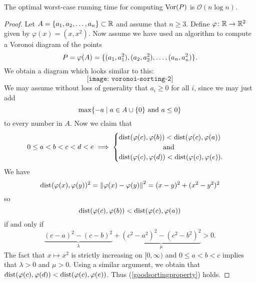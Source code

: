 \begin{thm} \label{thm:voronoicansort}
The optimal worst-case running time for computing $\operatorname{Vor}(P)$ is $\mathcal{O}(n \log n)$.
\end{thm}
\begin{proof}
Let $A = \{a_1, a_2, \ldots, a_n\} \subset \mathbb{R}$ and assume that $n \geq 3$. Define $\varphi \colon \mathbb{R} \to \mathbb{R}^2$ given by $\varphi(x) = (x, x^2)$. Now assume we have used an algorithm to compute a Voronoi diagram of the points
\[
    P = \varphi(A) = \{(a_1, a_1^2), (a_2, a_2^2), \ldots, (a_n, a_n^2)\}.
\]
We obtain a diagram which looks similar to this:
\[
    \texttt{[image: voronoi-sorting-2]}
\]
We may assume without loss of generality that $a_i \geq 0$ for all $i$, since we may just add
\[
    \max\{-a \mid a \in A \cup \{0\} \text{ and } a \leq 0\}
\]
to every number in $A$. Now we claim that
\begin{equation} \label{goodsortingproperty}
    0 \leq a < b < c < d < e
    \implies
    \begin{cases}
        \operatorname{dist}(\varphi(c), \varphi(b)) < \operatorname{dist}(\varphi(c), \varphi(a)) & \text{ } \\
        \quad\quad\quad\quad\quad\quad \text{ and } \quad & \text{ } \\
        \operatorname{dist}(\varphi(c), \varphi(d)) < \operatorname{dist}(\varphi(c), \varphi(e)). & \text{ }
    \end{cases}
\end{equation}
We have
\[
    \operatorname{dist}(\varphi(x), \varphi(y))^2 = \left\lVert \varphi(x) - \varphi(y) \right\rVert^2 = (x - y)^2 + (x^2 - y^2)^2
\]
so
\[
    \operatorname{dist}(\varphi(c), \varphi(b)) < \operatorname{dist}(\varphi(c), \varphi(a))
\]
if and only if
\[
    \underbrace{(c - a)^2 - (c - b)^2}_{\lambda} + \underbrace{(c^2 - a^2)^2 - (c^2 - b^2)^2}_{\mu} > 0.
\]
The fact that $x \mapsto x^2$ is strictly increasing on $[0, \infty)$ and $0 \leq a < b < c$ implies that $\lambda > 0$ and $\mu > 0$. Using a similar argument, we obtain that $\operatorname{dist}(\varphi(c), \varphi(d)) < \operatorname{dist}(\varphi(c), \varphi(e))$. Thus (\ref{goodsortingproperty}) holds.


\end{proof}

